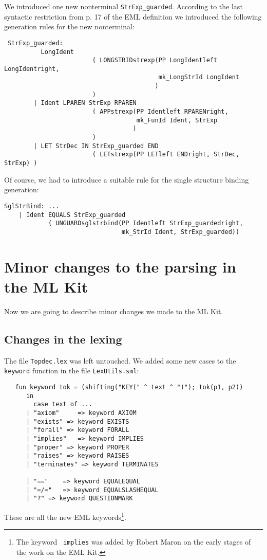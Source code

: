 We introduced one new nonterminal {\tt StrExp\_guarded}. According to
the last syntactic restriction from p. 17 of the EML definition we
introduced the following generation rules for the new nonterminal:
{\small
\begin{verbatim}
 StrExp_guarded:
          LongIdent
                        ( LONGSTRIDstrexp(PP LongIdentleft LongIdentright,
                                          mk_LongStrId LongIdent
                                         )
                        )
        | Ident LPAREN StrExp RPAREN
                        ( APPstrexp(PP Identleft RPARENright,
                                    mk_FunId Ident, StrExp
                                   )
                        )
        | LET StrDec IN StrExp_guarded END
                        ( LETstrexp(PP LETleft ENDright, StrDec, StrExp) )
\end{verbatim}}

Of course, we had to introduce a suitable rule for the single
structure binding generation: {\small
\begin{verbatim}
SglStrBind: ...
    | Ident EQUALS StrExp_guarded
            ( UNGUARDsglstrbind(PP Identleft StrExp_guardedright,
                                mk_StrId Ident, StrExp_guarded))
\end{verbatim}}

\section{Minor changes to the parsing in the ML Kit}
\label{sec:minor}

Now we are going to describe minor changes we made to the ML Kit. 


\subsection{Changes in the lexing}
\label{sec:lex}

The file {\tt Topdec.lex} was left untouched. We added some new cases
to the {\tt keyword} function in the file {\tt LexUtils.sml}:
{\small
\begin{verbatim}
   fun keyword tok = (shifting("KEY(" ^ text ^ ")"); tok(p1, p2))
      in
        case text of ...
      | "axiom"     => keyword AXIOM
      | "exists" => keyword EXISTS
      | "forall" => keyword FORALL
      | "implies"   => keyword IMPLIES
      | "proper" => keyword PROPER
      | "raises" => keyword RAISES
      | "terminates" => keyword TERMINATES

      | "=="    => keyword EQUALEQUAL
      | "=/="   => keyword EQUALSLASHEQUAL
      | "?" => keyword QUESTIONMARK
\end{verbatim}}
\noindent These are all the new EML keywords\footnote{The keyword {\tt
  implies} was added by Robert Maron on the early stages of the work
on the EML Kit.}.

